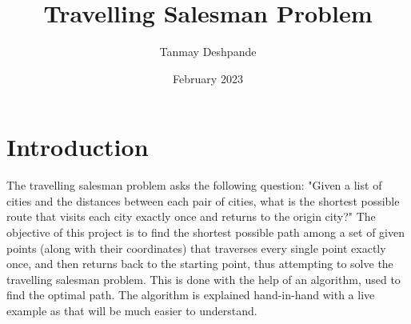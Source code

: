 \documentclass{article}
\title{Travelling Salesman Problem}
\author{Tanmay Deshpande}
\date{February 2023}
\begin{document}
\maketitle

\section{Introduction}
The travelling salesman problem asks the following question:
"Given a list of cities and the distances between each pair of cities,
what is the shortest possible route that visits each city exactly once
and returns to the origin city?"
The objective of this project is to find the shortest possible path
among a set of given points (along with their coordinates) that
traverses every single point exactly once, and then returns back to the
starting point, thus attempting to solve the travelling salesman
problem.
This is done with the help of an algorithm, used to find the optimal
path. The algorithm is explained hand-in-hand with a live example as
that will be much easier to understand.
\end{document}
